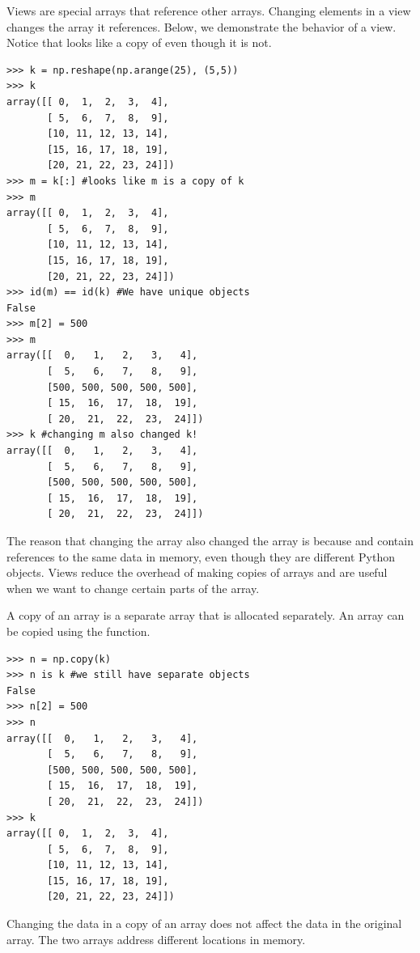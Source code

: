 Views are special arrays that reference other arrays.
Changing elements in a view changes the array it references.
Below, we demonstrate the behavior of a view.
Notice that  looks like a copy of  even though it is not.
\begin{lstlisting}
>>> k = np.reshape(np.arange(25), (5,5))
>>> k
array([[ 0,  1,  2,  3,  4],
       [ 5,  6,  7,  8,  9],
       [10, 11, 12, 13, 14],
       [15, 16, 17, 18, 19],
       [20, 21, 22, 23, 24]])
>>> m = k[:] #looks like m is a copy of k
>>> m
array([[ 0,  1,  2,  3,  4],
       [ 5,  6,  7,  8,  9],
       [10, 11, 12, 13, 14],
       [15, 16, 17, 18, 19],
       [20, 21, 22, 23, 24]])
>>> id(m) == id(k) #We have unique objects
False
>>> m[2] = 500
>>> m
array([[  0,   1,   2,   3,   4],
       [  5,   6,   7,   8,   9],
       [500, 500, 500, 500, 500],
       [ 15,  16,  17,  18,  19],
       [ 20,  21,  22,  23,  24]])
>>> k #changing m also changed k!
array([[  0,   1,   2,   3,   4],
       [  5,   6,   7,   8,   9],
       [500, 500, 500, 500, 500],
       [ 15,  16,  17,  18,  19],
       [ 20,  21,  22,  23,  24]])
\end{lstlisting}
The reason that changing the array  also changed the array  is because  
and  contain references to the same data in memory, even though they are different 
Python objects.
Views reduce the overhead of making copies of arrays and are useful when we want to change 
certain parts of the array.

A copy of an array is a separate array that is allocated separately.
An array can be copied using the  function.
\begin{lstlisting}
>>> n = np.copy(k)
>>> n is k #we still have separate objects
False
>>> n[2] = 500
>>> n
array([[  0,   1,   2,   3,   4],
       [  5,   6,   7,   8,   9],
       [500, 500, 500, 500, 500],
       [ 15,  16,  17,  18,  19],
       [ 20,  21,  22,  23,  24]])
>>> k
array([[ 0,  1,  2,  3,  4],
       [ 5,  6,  7,  8,  9],
       [10, 11, 12, 13, 14],
       [15, 16, 17, 18, 19],
       [20, 21, 22, 23, 24]])
\end{lstlisting}
Changing the data in a copy of an array does not affect the data in the original array.
The two arrays address different locations in memory.

